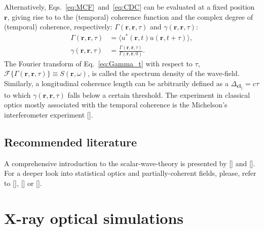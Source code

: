 \begin{refsection}
Alternatively, Eqs.~\ref{eq:MCF}~and~\ref{eq:CDC} can be evaluated at a fixed position $\textbf{r}$, giving rise to to the (temporal) coherence function and the complex degree of (temporal) coherence, respectively: $\Gamma(\textbf{r},\textbf{r},\tau)$ and $\gamma(\textbf{r},\textbf{r},\tau)$:
\begin{align}
    \Gamma(\textbf{r},\textbf{r},\tau)&=\big\langle u^*(\textbf{r},t)u(\textbf{r},t+\tau)\big\rangle,\label{eq:Gamma_t}\\
    \gamma(\textbf{r},\textbf{r},\tau) &= \frac{\Gamma(\textbf{r},\textbf{r},\tau)}{\Gamma(\textbf{r},\textbf{r},0)}.\label{eq:gamma_t}
\end{align}{}
The Fourier transform of Eq.~\ref{eq:Gamma_t} with respect to $\tau$, $\mathcal{F}\big\{\Gamma(\textbf{r},\textbf{r},\tau)\big\}\equiv S(\textbf{r},\omega)$, is called the spectrum density of the wave-field. Similarly, a longitudinal coherence length can be arbitrarily defined as a $\Delta_{\textbf{cl}_\parallel}=c\tau$ to which $\gamma(\textbf{r},\textbf{r},\tau)$ falls below a certain threshold.
The experiment in classical optics mostly associated with the temporal coherence is the Michelson's interferometer experiment [\cite[\textit{§5.1.1}]{Goodman2015}].

\subsection*{Recommended literature}

A comprehensive introduction to the scalar-wave-theory is presented by [\cite[\textit{§1} \& \textit{§2}]{Paganin2006}] and [\cite{Goodman2017}]. For a deeper look into statistical optics and partially-coherent fields, please, refer to [\cite[\textit{§4}]{Mandel1995}], [\cite[\textit{§10}]{born_wolf1999}] or [\cite[\textit{§5}]{Goodman2015}].

\section{X-ray optical simulations}\label{sec:optical_simulations}


\end{refsection}
